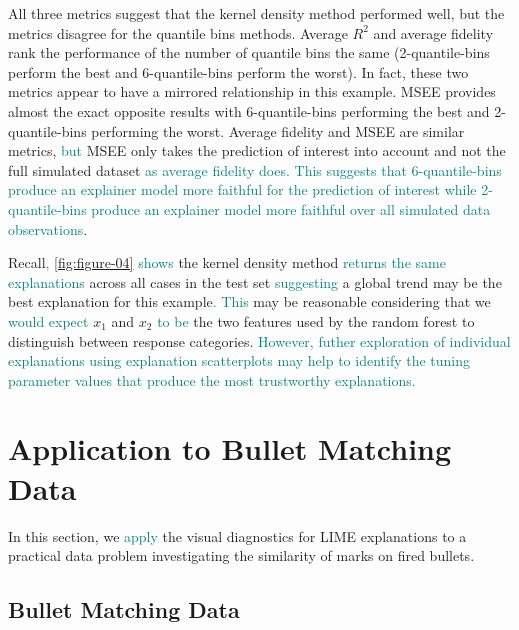 \documentclass[AMS,STIX2COL]{WileyNJD-v2}\usepackage[]{graphicx}\usepackage[]{color}
\newcommand{\kge}[1]{\textcolor{teal}{#1}}
\renewcommand{\sout}[1]{\unskip}
\begin{document}
All three metrics suggest that the kernel density method performed well, but the metrics disagree for the quantile bins methods. Average $R^2$ and average fidelity rank the performance of the number of quantile bins the same (2-quantile-bins perform the best and 6-quantile-bins perform the worst). In fact, these two metrics appear to have a mirrored relationship in this example. MSEE provides almost the exact opposite results with 6-quantile-bins performing the best and 2-quantile-bins performing the worst. Average fidelity and MSEE are similar metrics, \kge{but} \sout{so it is \sout{not} surprising that they \sout{would} \kge{do not} agree in this example. \kge{The discrepancy may be because} \sout{Another factor might be that}} MSEE only takes the prediction of interest into account and not the full simulated dataset \kge{as average fidelity does.} \kge{This suggests that 6-quantile-bins produce an explainer model more faithful for the prediction of interest while 2-quantile-bins produce an explainer model more faithful over all simulated data observations}. \sout{The contradiction between metrics makes it difficult to identify which simulation method to trust.}

Recall\kge{,} \sout{that} \autoref{fig:figure-04} \kge{shows} \sout{indicates that} the kernel density method \kge{returns the same explanations} \sout{selected the same feature} across all cases in the test set\sout{ for both the first and second features. It appears that} \kge{suggesting} a global trend may be the best explanation for this example\kge{.}\sout{, which} \kge{This} may be reasonable considering that we \kge{would expect} \sout{know that both} $x_1$ and $x_2$ \kge{to be} \sout{are} the two features \sout{that should be the features} used by the random forest to distinguish between response categories. \kge{However, futher exploration of individual explanations using explanation scatterplots may help to identify the tuning parameter values that produce the most trustworthy explanations.}

\section{Application to Bullet Matching Data} \label{application}

In this section, we \sout{provide a discussion of the application of} \kge{apply} the visual diagnostics for LIME explanations to a practical data problem investigating the similarity of marks on fired bullets.

\subsection{Bullet Matching Data}
\end{document}
